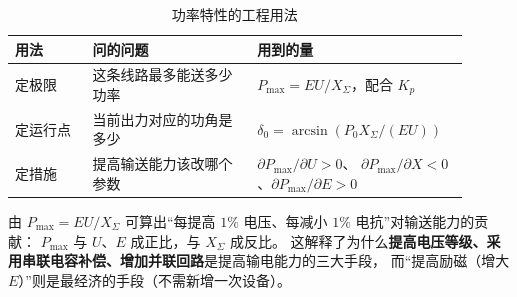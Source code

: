 \begin{table}[htbp]
  \centering
  \caption{功率特性的工程用法}
  \small
  \begin{tabular}{@{}p{0.16\linewidth}p{0.34\linewidth}p{0.40\linewidth}@{}}
    \toprule
    用法 & 问的问题 & 用到的量 \\
    \midrule
    定极限 & 这条线路最多能送多少功率 & $P_{\max}=EU/X_{\Sigma}$，配合 $K_p$ \\
    定运行点 & 当前出力对应的功角是多少 & $\delta_0=\arcsin\left(P_0X_{\Sigma}/(EU)\right)$ \\
    定措施 & 提高输送能力该改哪个参数 & $\partial P_{\max}/\partial U>0$、
      $\partial P_{\max}/\partial X<0$、$\partial P_{\max}/\partial E>0$ \\
    \bottomrule
  \end{tabular}
\end{table}

由 $P_{\max}=EU/X_{\Sigma}$ 可算出“每提高 $1\%$ 电压、每减小 $1\%$ 电抗”对输送能力的贡献：
$P_{\max}$ 与 $U$、$E$ 成正比，与 $X_{\Sigma}$ 成反比。
这解释了为什么\textbf{提高电压等级、采用串联电容补偿、增加并联回路}是提高输电能力的三大手段，
而“提高励磁（增大 $E$）”则是最经济的手段（不需新增一次设备）。

